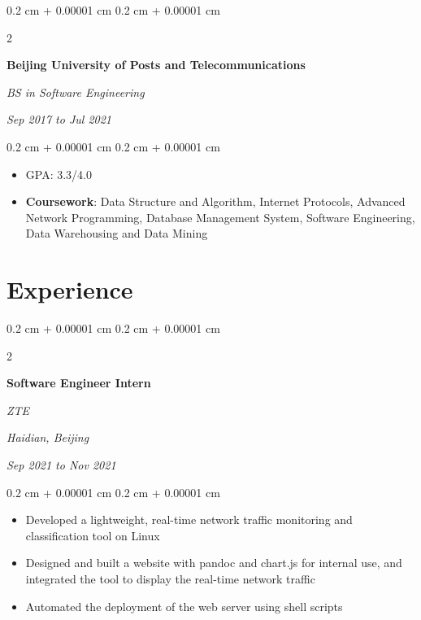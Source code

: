 \documentclass[10pt, letterpaper]{article}
\newenvironment{highlights}{
    \begin{itemize}[
        topsep=0.10 cm,
        parsep=0.10 cm,
        partopsep=0pt,
        itemsep=0pt,
        leftmargin=0.4 cm + 10pt
    ]
}{
    \end{itemize}
} %
\newenvironment{onecolentry}{
    \begin{adjustwidth}{
        0.2 cm + 0.00001 cm
    }{
        0.2 cm + 0.00001 cm
    }
}{
    \end{adjustwidth}
} %
\newenvironment{twocolentry}[2][]{
    \onecolentry
    \def\secondColumn{#2}
    \setcolumnwidth{\fill, 4.5 cm}
    \begin{paracol}{2}
}{
    \switchcolumn \raggedleft \secondColumn
    \end{paracol}
    \endonecolentry
} %
\begin{document}
        \vspace{0.2 cm}

        \begin{twocolentry}{
            
            
        \textit{Sep 2017 to Jul 2021}}
            \textbf{Beijing University of Posts and Telecommunications}

            \textit{BS in Software Engineering}
        \end{twocolentry}

        \vspace{0.10 cm}
        \begin{onecolentry}
            \begin{highlights}
                \item GPA: 3.3/4.0
                \item \textbf{Coursework}: Data Structure and Algorithm, Internet Protocols, Advanced Network Programming, Database Management System, Software Engineering, Data Warehousing and Data Mining
            \end{highlights}
        \end{onecolentry}



    
    \section{Experience}



        
        \begin{twocolentry}{
        \textit{Haidian, Beijing}    
            
        \textit{Sep 2021 to Nov 2021}}
            \textbf{Software Engineer Intern}
            
            \textit{ZTE}
        \end{twocolentry}

        \vspace{0.10 cm}
        \begin{onecolentry}
            \begin{highlights}
                \item Developed a lightweight, real-time network traffic monitoring and classification tool on Linux
                \item Designed and built a website with pandoc and chart.js for internal use, and integrated the tool to display the real-time network traffic
                \item Automated the deployment of the web server using shell scripts
            \end{highlights}
        \end{onecolentry}
\end{document}
